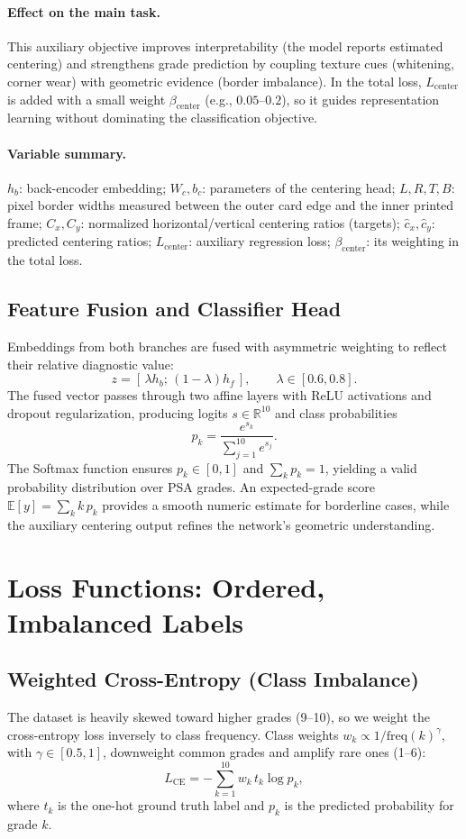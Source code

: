 \documentclass[12pt]{article}
\begin{document}
\paragraph{Effect on the main task.}
This auxiliary objective improves interpretability (the model reports estimated centering) and strengthens grade prediction by coupling texture cues (whitening, corner wear) with geometric evidence (border imbalance). 
In the total loss, $L_{\text{center}}$ is added with a small weight $\beta_{\text{center}}$ (e.g., $0.05$--$0.2$), so it guides representation learning without dominating the classification objective.

\paragraph{Variable summary.}
$h_b$: back-encoder embedding; $W_c,b_c$: parameters of the centering head; 
$L,R,T,B$: pixel border widths measured between the outer card edge and the inner printed frame; 
$C_x,C_y$: normalized horizontal/vertical centering ratios (targets); 
$\hat{c}_x,\hat{c}_y$: predicted centering ratios; 
$L_{\text{center}}$: auxiliary regression loss; $\beta_{\text{center}}$: its weighting in the total loss.


\subsection{Feature Fusion and Classifier Head}
Embeddings from both branches are fused with asymmetric weighting to reflect their relative diagnostic value:
\[
z = [\,\lambda h_b;\,(1-\lambda)h_f\,], \qquad \lambda \in [0.6,0.8].
\]
The fused vector passes through two affine layers with ReLU activations and dropout regularization, producing logits $s \in \mathbb{R}^{10}$ and class probabilities
\[
p_k = \frac{e^{s_k}}{\sum_{j=1}^{10} e^{s_j}}.
\]
The Softmax function ensures $p_k \in [0,1]$ and $\sum_k p_k = 1$, yielding a valid probability distribution over PSA grades. 
An expected-grade score $\mathbb{E}[y] = \sum_k k\,p_k$ provides a smooth numeric estimate for borderline cases, while the auxiliary centering output refines the network’s geometric understanding.


\section{Loss Functions: Ordered, Imbalanced Labels}

\subsection{Weighted Cross-Entropy (Class Imbalance)}
The dataset is heavily skewed toward higher grades (9--10), so we weight the cross-entropy loss inversely to class frequency.
Class weights $w_k \propto 1/\text{freq}(k)^\gamma$, with $\gamma \in [0.5,1]$, downweight common grades and amplify rare ones (1--6):
\[
L_{\text{CE}} = -\sum_{k=1}^{10} w_k\, t_k \log p_k,
\]
where $t_k$ is the one-hot ground truth label and $p_k$ is the predicted probability for grade $k$.
\end{document}

